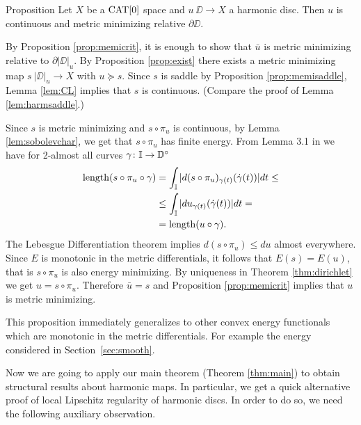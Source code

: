 \documentclass{article}
\begin{document}
 \begin{thm}{Proposition}\label{prop:harmonic}
Let $X$ be a $\mathop{\rm CAT}\nolimits[0]$ space 
and $u\:\DD\to X$ a harmonic disc.
Then $u$ is continuous and metric minimizing relative $\partial\DD$.
\end{thm}


By Proposition \ref{prop:memicrit}, it is enough to show that $\bar u$ is metric minimizing relative to $\partial|\DD|_u$.
By Proposition \ref{prop:exist} there exists a metric minimizing map
$s\:|\DD|_u\to X$ with $u\succcurlyeq s$. 
Since $s$ is saddle by Proposition \ref{prop:memisaddle}, Lemma \ref{lem:CL} implies that $s$
is continuous. 
(Compare the proof of Lemma \ref{lem:harmsaddle}.) 

Since $s$ is metric minimizing and $s\circ\pi_u$ is continuous, by Lemma \ref{lem:sobolevchar}, we get that $s\circ\pi_u$ has finite energy. 
From Lemma 3.1 in \cite{LW3} we have for 2-almost all 
curves $\gamma\colon\mathbb{I}\to \mathbb{D}^\circ$
\begin{align*}
\mathop{\rm length}\nolimits(s\circ\pi_u\circ \gamma)
&=\int_{\mathbb{I}} |d(s\circ\pi_u)_{\gamma(t)}(\dot\gamma(t))|dt\leq
\\
&\leq \int_{\mathbb{I}} |du_{\gamma(t)}(\dot\gamma(t))|dt=
\\
&=\mathop{\rm length}\nolimits(u\circ \gamma).
\end{align*}
The Lebesgue Differentiation theorem implies $d(s\circ\pi_u)\leq du$ almost everywhere. Since $E$ is monotonic in the metric differentials, it follows that 
$E(s)=E(u)$, that is $s\circ\pi_u$ is also energy minimizing.
By uniqueness in Theorem \ref{thm:dirichlet} we get $u=s\circ\pi_u$. Therefore $\bar u=s$ and Proposition \ref{prop:memicrit} implies that $u$
is metric minimizing.
 \qeds
 
 
This proposition immediately generalizes to other convex energy functionals which are monotonic in the metric differentials.
For example the energy considered in Section~\ref{sec:smooth}.
 
 
 
 
 
 
 
 
 
 
 
 
 
 



Now we are going to apply our main theorem (Theorem \ref{thm:main}) to obtain structural results about harmonic maps. 
In particular,
we get a quick alternative proof of local Lipschitz regularity of harmonic discs.
In order to do so, we need the following auxiliary observation.
\end{document}
